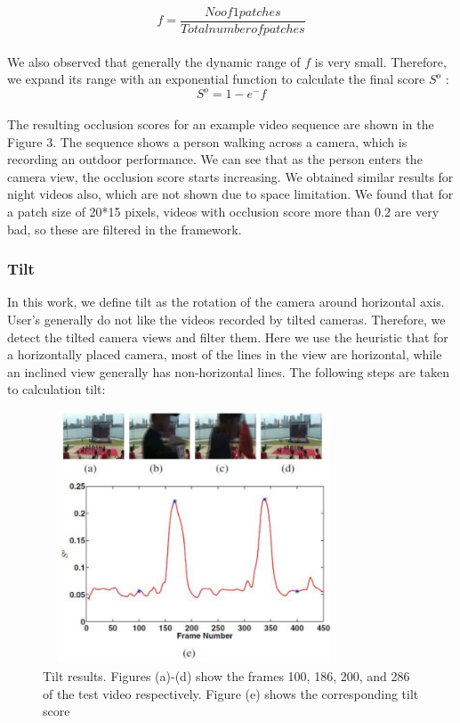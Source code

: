 \documentclass{sig-alternate}
\begin{document}
\begin{itemize}
\[f=\frac{No of 1 patches}{Total number of patches} 
\]\\
We also observed that generally the dynamic range of $f$ is very
small. Therefore, we expand its range with an exponential function
to calculate the final score $S^o$ :\\
  $$ S^o = 1 - e^-f $$\\
The resulting occlusion scores for an example video sequence
are shown in the Figure 3. The sequence shows a person walking
across a camera, which is recording an outdoor performance. We
can see that as the person enters the camera view, the occlusion
score starts increasing. We obtained similar results for night videos
also, which are not shown due to space limitation. We found that
for a patch size of 20*15 pixels, videos with occlusion score more
than 0.2 are very bad, so these are filtered in the framework.
\end{itemize}

\subsubsection{Tilt}
In this work, we define tilt as the rotation of the camera around
horizontal axis. User's generally do not like the videos recorded
by tilted cameras. Therefore, we detect the tilted camera views
and filter them. Here we use the heuristic that for a horizontally
placed camera, most of the lines in the view are horizontal, while
an inclined view generally has non-horizontal lines. The following
steps are taken to calculation tilt:



\begin{figure}[h!]

  \includegraphics[width=9cm, height=7.5cm]{video.pdf}
\caption{Tilt results. Figures (a)-(d) show the frames 100, 186,
200, and 286 of the test video respectively. Figure (e) shows the
corresponding tilt score}
\end{figure}
\end{document}
